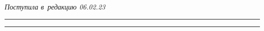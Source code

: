 \vspace*{-6pt}





\hfill{\small\textit{Поступила в~редакцию 06.02.23}}





\vspace*{8pt}





\hrule





\vspace*{2pt}















\hrule










\def\tit{METHODS OF CLASSIFYING THE~DISTANCE LEARNING SYSTEM USERS IN~THE~MODEL 


OF~CONSTRUCTING THEIR~PERSONALIZED LEARNING STRATEGIES}











\def\titkol{Methods of classifying the~distance learning system users in~the~model 


of %


learning strategies}





\def\aut{Ya.\,G.~Martyushova, T.\,A.~Mineyeva, and~A.\,V.~Naumov}





\def\autkol{Ya.\,G.~Martyushova, T.\,A.~Mineyeva, and~A.\,V.~Naumov}





